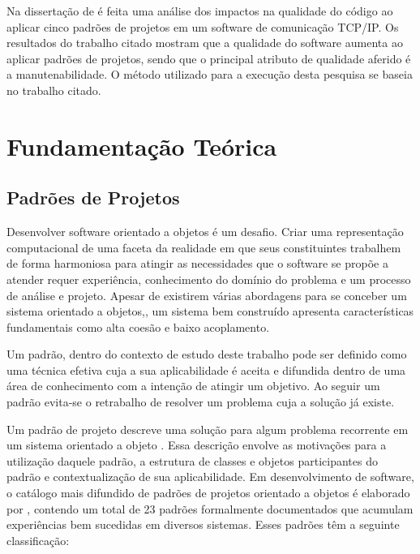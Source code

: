 \documentclass[conference]{IEEEtran}
\begin{document}
Na dissertação de \cite{turk} é feita uma análise dos impactos na
qualidade do código  ao aplicar cinco padrões de projetos em um software de comunicação
TCP/IP. Os resultados do trabalho citado mostram que a qualidade do software
aumenta ao aplicar padrões de projetos, sendo que o principal atributo de
qualidade aferido é a manutenabilidade. O método utilizado para a execução desta
pesquisa se baseia no trabalho citado. 

\section{Fundamentação Teórica}

\subsection{Padrões de Projetos}


Desenvolver software orientado a objetos é um desafio. Criar uma representação
computacional de uma faceta da realidade em que seus constituintes trabalhem de
forma harmoniosa para atingir as necessidades que o software se propõe a
atender requer experiência, conhecimento do domínio do problema e um processo de
análise e projeto. Apesar de existirem várias abordagens para se conceber um
sistema orientado a objetos\cite{evans2004ddd},\cite{gomma11}, um sistema bem
construído apresenta características fundamentais como alta coesão e
baixo acoplamento.

Um padrão, dentro do contexto de estudo deste trabalho pode ser definido
como uma técnica efetiva cuja a sua aplicabilidade é aceita e difundida dentro
de uma área de conhecimento com a intenção de atingir um
objetivo\cite{MetskerWake06}. Ao seguir um padrão evita-se o retrabalho de
resolver um problema cuja a solução já existe.

Um padrão de projeto descreve uma solução para algum problema recorrente em um
sistema orientado a objeto \cite{gof}. Essa descrição envolve as motivações para
a utilização daquele padrão, a estrutura de classes e objetos participantes do
padrão e contextualização de sua aplicabilidade. Em desenvolvimento de software,
o catálogo mais difundido de padrões de projetos orientado a objetos é elaborado
por \cite{gof}, contendo um total de 23 padrões formalmente documentados
que acumulam experiências bem sucedidas em diversos sistemas. Esses padrões têm
a seguinte classificação:
\end{document}
